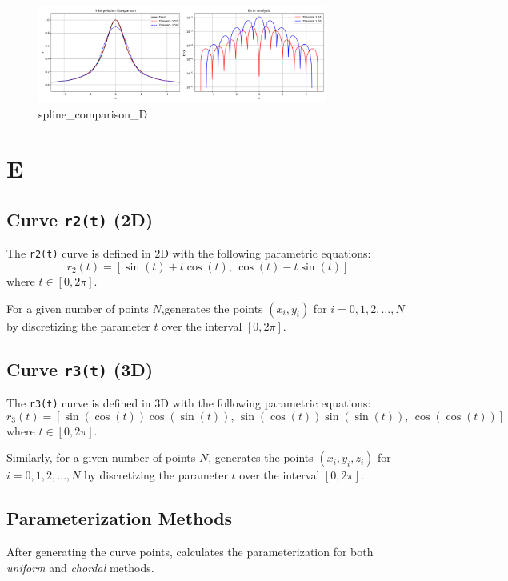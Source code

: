 \documentclass[a4paper]{article}
\begin{document}
\begin{figure}[H]
    \centering
    \includegraphics[width=0.85\textwidth]{figure/spline_comparison_D.png}
    \caption{spline\_comparison\_D}
    \label{fig:spline_comparison_D}
\end{figure}

\section*{E}
\subsection*{Curve \texttt{r2(t)} (2D)}

The \texttt{r2(t)} curve is defined in 2D with the following parametric equations:
\[
r_2(t) = \left[ \sin(t) + t \cos(t), \, \cos(t) - t \sin(t) \right]
\]
where \( t \in [0, 2\pi] \).

For a given number of points \( N \),generates the points \( (x_i, y_i) \) for \( i = 0, 1, 2, \dots, N \) by discretizing the parameter \( t \) over the interval \( [0, 2\pi] \).

\subsection*{Curve \texttt{r3(t)} (3D)}

The \texttt{r3(t)} curve is defined in 3D with the following parametric equations:
\[
r_3(t) = \left[ \sin(\cos(t)) \cos(\sin(t)), \, \sin(\cos(t)) \sin(\sin(t)), \, \cos(\cos(t)) \right]
\]
where \( t \in [0, 2\pi] \).

Similarly, for a given number of points \( N \), generates the points \( (x_i, y_i, z_i) \) for \( i = 0, 1, 2, \dots, N \) by discretizing the parameter \( t \) over the interval \( [0, 2\pi] \).

\subsection*{ Parameterization Methods}

After generating the curve points,  calculates the parameterization for both \textit{uniform} and \textit{chordal} methods.
\end{document}
